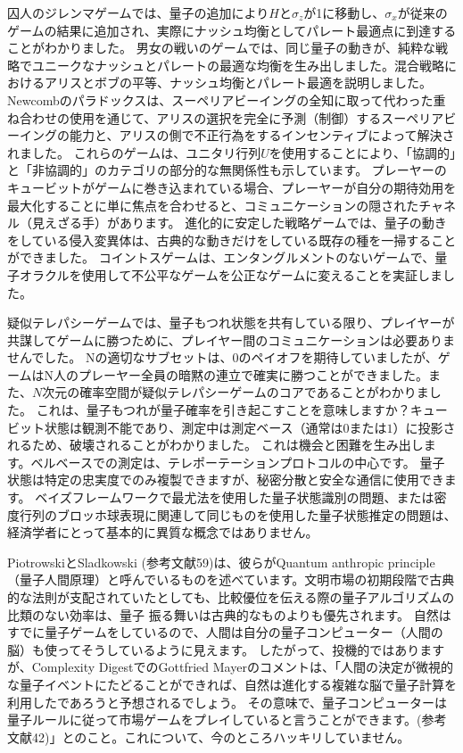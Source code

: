 囚人のジレンマゲームでは、量子の追加により$H$と$\sigma_z$が1に移動し、$\sigma_x$が従来のゲームの結果に追加され、実際にナッシュ均衡としてパレート最適点に到達することがわかりました。
男女の戦いのゲームでは、同じ量子の動きが、純粋な戦略でユニークなナッシュとパレートの最適な均衡を生み出しました。混合戦略におけるアリスとボブの平等、ナッシュ均衡とパレート最適を説明しました。
Newcombのパラドックスは、スーペリアビーイングの全知に取って代わった重ね合わせの使用を通じて、アリスの選択を完全に予測（制御）するスーペリアビーイングの能力と、アリスの側で不正行為をするインセンティブによって解決されました。
これらのゲームは、ユニタリ行列$U$を使用することにより、「協調的」と「非協調的」のカテゴリの部分的な無関係性も示しています。
プレーヤーのキュービットがゲームに巻き込まれている場合、プレーヤーが自分の期待効用を最大化することに単に焦点を合わせると、コミュニケーションの隠されたチャネル（見えざる手）があります。
進化的に安定した戦略ゲームでは、量子の動きをしている侵入変異体は、古典的な動きだけをしている既存の種を一掃することができました。
コイントスゲームは、エンタングルメントのないゲームで、量子オラクルを使用して不公平なゲームを公正なゲームに変えることを実証しました。

疑似テレパシーゲームでは、量子もつれ状態を共有している限り、プレイヤーが共謀してゲームに勝つために、プレイヤー間のコミュニケーションは必要ありませんでした。
Nの適切なサブセットは、$0$のペイオフを期待していましたが、ゲームはN人のプレーヤー全員の暗黙の連立で確実に勝つことができました。また、$N$次元の確率空間が疑似テレパシーゲームのコアであることがわかりました。
これは、量子もつれが量子確率を引き起こすことを意味しますか？キュービット状態は観測不能であり、測定中は測定ベース（通常は$0$または$1$）に投影されるため、破壊されることがわかりました。
これは機会と困難を生み出します。ベルベースでの測定は、テレポーテーションプロトコルの中心です。
量子状態は特定の忠実度でのみ複製できますが、秘密分散と安全な通信に使用できます。
ベイズフレームワークで最尤法を使用した量子状態識別の問題、または密度行列のブロッホ球表現に関連して同じものを使用した量子状態推定の問題は、経済学者にとって基本的に異質な概念ではありません。

PiotrowskiとSladkowski (参考文献59)は、彼らがQuantum anthropic principle（量子人間原理）と呼んでいるものを述べています。文明市場の初期段階で古典的な法則が支配されていたとしても、比較優位を伝える際の量子アルゴリズムの比類のない効率は、量子 振る舞いは古典的なものよりも優先されます。 自然はすでに量子ゲームをしているので、人間は自分の量子コンピューター（人間の脳）も使ってそうしているように見えます。
したがって、投機的ではありますが、Complexity DigestでのGottfried Mayerのコメントは、「人間の決定が微視的な量子イベントにたどることができれば、自然は進化する複雑な脳で量子計算を利用したであろうと予想されるでしょう。
  その意味で、量子コンピューターは量子ルールに従って市場ゲームをプレイしていると言うことができます。(参考文献42)」とのこと。これについて、今のところハッキリしていません。
  
